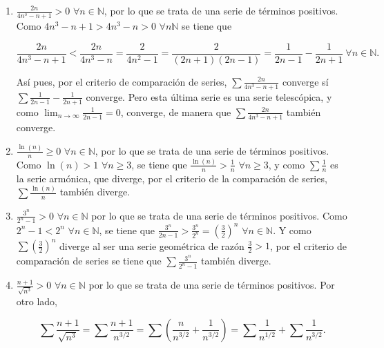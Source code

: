 \documentclass[
  spanish,
  a4paper,
]{scrreport}
\theoremstyle{definition}
\theoremstyle{remark}
\begin{document}
\begin{tcolorbox}[enhanced jigsaw, arc=.35mm, bottomrule=.15mm, bottomtitle=1mm, breakable, colback=white, colbacktitle=quarto-callout-tip-color!10!white, colframe=quarto-callout-tip-color-frame, coltitle=black, left=2mm, leftrule=.75mm, opacityback=0, opacitybacktitle=0.6, rightrule=.15mm, title=\textcolor{quarto-callout-tip-color}{\faLightbulb}\hspace{0.5em}{Solución}, titlerule=0mm, toprule=.15mm, toptitle=1mm]

\begin{enumerate}
\def\labelenumi{\alph{enumi}.}
\item
  \(\frac{2n}{4n^3-n+1}>0\) \(\forall n\in\mathbb{N}\), por lo que se
  trata de una serie de términos positivos. Como \(4n^3-n+1>4n^3-n>0\)
  \(\forall n\mathbb{N}\) se tiene que

  \[
  \frac{2n}{4n^3-n+1}<\frac{2n}{4n^3-n}=\frac{2}{4n^2-1} = \frac{2}{(2n+1)(2n-1)} = \frac{1}{2n-1}-\frac{1}{2n+1}\ \forall n\in\mathbb{N}.
  \]

  Así pues, por el criterio de comparación de series,
  \(\sum \frac{2n}{4n^3-n+1}\) converge sí
  \(\sum \frac{1}{2n-1}-\frac{1}{2n+1}\) converge. Pero esta última
  serie es una serie telescópica, y como
  \(\lim_{n\to\infty} \frac{1}{2n-1}=0\), converge, de manera que
  \(\sum \frac{2n}{4n^3-n+1}\) también converge.
\item
  \(\frac{\ln(n)}{n}\geq 0\) \(\forall n\in\mathbb{N}\), por lo que se
  trata de una serie de términos positivos. Como \(\ln(n)>1\)
  \(\forall n\geq 3\), se tiene que \(\frac{\ln(n)}{n}>\frac{1}{n}\)
  \(\forall n\geq 3\), y como \(\sum \frac{1}{n}\) es la serie armónica,
  que diverge, por el criterio de la comparación de series,
  \(\sum \frac{\ln(n)}{n}\) también diverge.
\item
  \(\frac{3^n}{2^n-1}>0\) \(\forall n\in\mathbb{N}\) por lo que se trata
  de una serie de términos positivos. Como \(2^n-1<2^n\)
  \(\forall n\in\mathbb{N}\), se tiene que
  \(\frac{3^n}{2n-1}>\frac{3^n}{2^n}=\left(\frac{3}{2}\right)^n\)
  \(\forall n\in\mathbb{N}\). Y como \(\sum \left(\frac{3}{2}\right)^n\)
  diverge al ser una serie geométrica de razón \(\frac{3}{2}>1\), por el
  criterio de comparación de series se tiene que
  \(\sum \frac{3^n}{2^n-1}\) también diverge.
\item
  \(\frac{n+1}{\sqrt{n^3}}>0\) \(\forall n\in\mathbb{N}\) por lo que se
  trata de una serie de términos positivos. Por otro lado,

  \[
   \sum \frac{n+1}{\sqrt{n^3}} = \sum \frac{n+1}{n^{3/2}} = \sum \left(\frac{n}{n^{3/2}} + \frac{1}{n^{3/2}}\right) = \sum \frac{1}{n^{1/2}} + \sum \frac{1}{n^{3/2}}.
   \]


\end{enumerate}
\end{tcolorbox}
\end{document}
